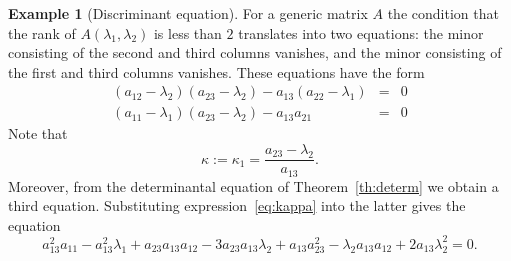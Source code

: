 \documentclass[10pt,twoside,a4paper,reqno]{amsart}
\theoremstyle{plain}
\theoremstyle{definition}
\newtheorem{exam+}           {Example}
\theoremstyle{remark}
\newenvironment{example}{\begin{exam+}}{\end{exam+}}
\begin{document}
\begin{example}[Discriminant equation]
For a generic matrix $A$ the condition that the rank of $A(\lambda_1,\lambda_2)$ is less than $2$ translates into two equations: the minor consisting of the second and third columns
vanishes, and the minor consisting of the first and third
columns vanishes.
These equations have the form
\begin{eqnarray}\label{eq:minors}
  (a_{12}-\lambda_2)(a_{23}-\lambda_2)-a_{13} (a_{22}-\lambda_1) &=& 0 \label{eq:minor23}\\
  (a_{11}-\lambda_1)(a_{23}-\lambda_2)-a_{13} a_{21} &=&
  0 \label{eq:minor13}
\end{eqnarray}
Note that
\begin{equation}\label{eq:kappa}
\kappa:=\kappa_1=\frac{a_{23}-\lambda_2}{a_{13}}.
\end{equation}
Moreover, from the determinantal equation of Theorem~\ref{th:determ} we obtain a third equation. 
Substituting expression~\eqref{eq:kappa} into the latter gives the equation
\begin{equation}\label{eq:critical}
a_{13}^2 a_{11}-a_{13}^2\lambda_1+a_{23} a_{13}
a_{12}- 3 a_{23} a_{13} \lambda_2+ a_{13}
a_{23}^2-\lambda_2 a_{13} a_{12}+2
a_{13}\lambda_2^2=0.  
\end{equation}


\end{example}
\end{document}
